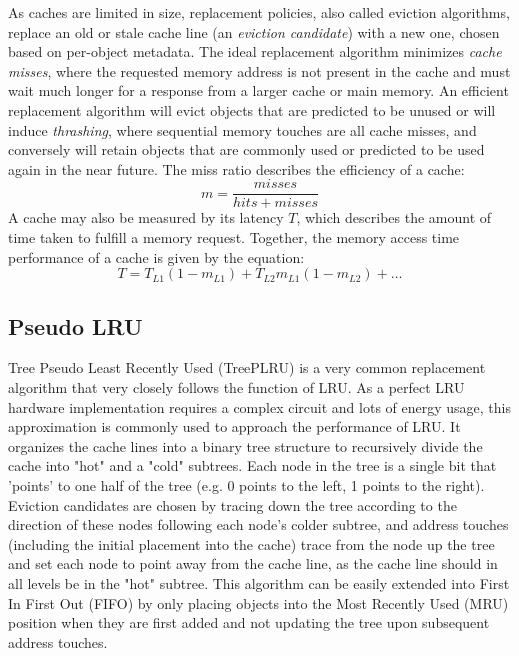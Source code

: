 \documentclass[letterpaper]{article}
\begin{document}
As caches are limited in size, replacement policies, also called eviction algorithms,
replace an old or stale cache line (an \textit{eviction candidate}) with a new one,
chosen based on per-object metadata.
The ideal replacement algorithm minimizes \textit{cache misses}, where the requested memory address
is not present in the cache and must wait much longer for a response
from a larger cache or main memory.
An efficient replacement algorithm will evict objects that are predicted to be unused
or will induce \textit{thrashing}, where sequential memory touches are all cache misses,
and conversely will retain objects that are commonly used
or predicted to be used again in the near future.
The miss ratio describes the efficiency of a cache:
\begin{equation}
  m = \frac{misses}{hits + misses}
\end{equation}
A cache may also be measured by its latency $T$, which describes the amount of time taken
to fulfill a memory request.
Together, the memory access time performance of a cache is given by the equation:
\begin{equation}
  T = T_{L1}(1-m_{L1}) + T_{L2}m_{L1}(1-m_{L2}) + \dots
\end{equation}

\subsection{Pseudo LRU}

Tree Pseudo Least Recently Used (TreePLRU) is a very common replacement algorithm that
very closely follows the function of LRU.
As a perfect LRU hardware implementation requires a complex circuit and lots of energy usage,
this approximation is commonly used to approach the performance of LRU.
It organizes the cache lines into a binary tree structure to recursively divide the cache
into "hot" and a "cold" subtrees.
Each node in the tree is a single bit that 'points' to one half of the tree
(e.g. 0 points to the left, 1 points to the right).
Eviction candidates are chosen by tracing down the tree according to the direction of these nodes
following each node's colder subtree,
and address touches (including the initial placement into the cache)
trace from the node up the tree and set each node to point away from the cache line,
as the cache line should in all levels be in the "hot" subtree.
This algorithm can be easily extended into First In First Out (FIFO)
by only placing objects into the Most Recently Used (MRU) position when they are first added
and not updating the tree upon subsequent address touches.
\end{document}
